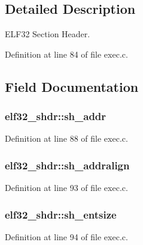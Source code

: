 \subsection{Detailed Description}
E\+L\+F32 Section Header. 

Definition at line 84 of file exec.\+c.



\subsection{Field Documentation}
\hypertarget{structelf32__shdr_a7054ce2ce815d205d451bfe7ce2e145e}{
\subsubsection[{sh\+\_\+addr}]{ elf32\+\_\+shdr\+::sh\+\_\+addr}}\label{structelf32__shdr_a7054ce2ce815d205d451bfe7ce2e145e}


Definition at line 88 of file exec.\+c.

\hypertarget{structelf32__shdr_a74275f49dbae08127832dc1061ed24ab}{
\subsubsection[{sh\+\_\+addralign}]{ elf32\+\_\+shdr\+::sh\+\_\+addralign}}\label{structelf32__shdr_a74275f49dbae08127832dc1061ed24ab}


Definition at line 93 of file exec.\+c.

\hypertarget{structelf32__shdr_a0360b455d1586deda50df0adaa7a87e0}{
\subsubsection[{sh\+\_\+entsize}]{ elf32\+\_\+shdr\+::sh\+\_\+entsize}}\label{structelf32__shdr_a0360b455d1586deda50df0adaa7a87e0}


Definition at line 94 of file exec.\+c.

